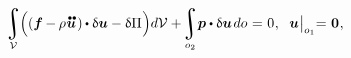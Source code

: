 \nopagebreak\vspace{-0.2em}
\begin{equation}\label{lineartheory:principleofvirtualwork}
\displaystyle\integral\displaylimits_{\mathcal{V}}
\hspace{-0.2ex} \Bigl(
    \left(
        \bm{f}
        \hspace{-0.1ex} - \hspace{-0.1ex}
        \rho \hspace{.1ex}
        \mathdotdotabove{\bm{u}}
        \hspace{.2ex}
    \right)
    \hspace{-0.1ex}
    \dotp
    \variation{\bm{u}} - \variation{\potential}
\hspace{.1ex} \Bigr) d\mathcal{V}
+ \hspace{-0.3ex}
\displaystyle\integral\displaylimits_{o_2} \hspace{-0.4ex} \bm{p} \dotp \variation{\bm{u}} \hspace{.25ex} do \hspace{.1ex}
= \hspace{.1ex} 0
\hspace{.1ex} ,
\hspace{.6em}
%
\bm{u} \hspace{.1ex}
\bigr|_{o_1}
\hspace{-0.64ex} = \hspace{.1ex}
\bm{0}
\hspace{.1ex} ,
\vspace{-0.2em}
\end{equation}

\noindent\vspace{-0.2em}

